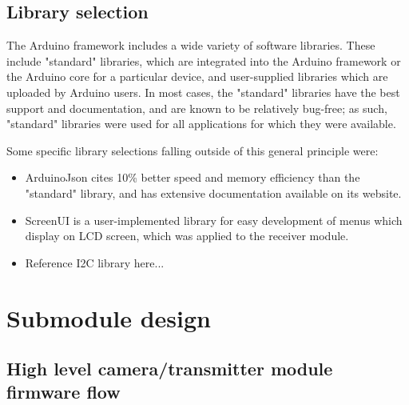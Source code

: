 \subsection{Library selection}

The Arduino framework includes a wide variety of software libraries. These include "standard" libraries, which are integrated into the Arduino framework or the Arduino core for a particular device, and user-supplied libraries which are uploaded by Arduino users. In most cases, the "standard" libraries have the best support and documentation, and are known to be relatively bug-free; as such, "standard" libraries were used for all applications for which they were available.

Some specific library selections falling outside of this general principle were:

\begin{itemize}
    \item ArduinoJson \cite{Arduino JSON citation} cites 10\% better speed and memory efficiency than the "standard" library, and has extensive documentation available on its website.
    \item ScreenUI \cite{Screen UI library here} is a user-implemented library for easy development of menus which display on LCD screen, which was applied to the receiver module.
    \item Reference I2C library here...
\end{itemize}



\section{Submodule design \label{s:firmware-design-process}}

\subsection{High level camera/transmitter module firmware flow}


